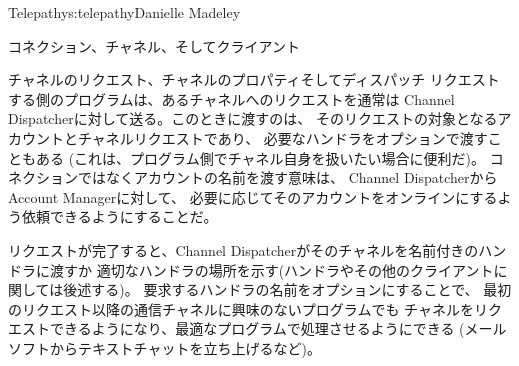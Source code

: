 \begin{aosachapter}{Telepathy}{s:telepathy}{Danielle Madeley}
\begin{aosasect1}{コネクション、チャネル、そしてクライアント}
\begin{aosasect2}{チャネルのリクエスト、チャネルのプロパティそしてディスパッチ}
リクエストする側のプログラムは、あるチャネルへのリクエストを通常は
Channel Dispatcherに対して送る。このときに渡すのは、
そのリクエストの対象となるアカウントとチャネルリクエストであり、
必要なハンドラをオプションで渡すこともある
(これは、プログラム側でチャネル自身を扱いたい場合に便利だ)。
コネクションではなくアカウントの名前を渡す意味は、
Channel DispatcherからAccount Managerに対して、
必要に応じてそのアカウントをオンラインにするよう依頼できるようにすることだ。

リクエストが完了すると、Channel Dispatcherがそのチャネルを名前付きのハンドラに渡すか
適切なハンドラの場所を示す(ハンドラやその他のクライアントに関しては後述する)。
要求するハンドラの名前をオプションにすることで、
最初のリクエスト以降の通信チャネルに興味のないプログラムでも
チャネルをリクエストできるようになり、最適なプログラムで処理させるようにできる
(メールソフトからテキストチャットを立ち上げるなど)。



\end{aosasect2}
\end{aosasect1}
\end{aosachapter}
